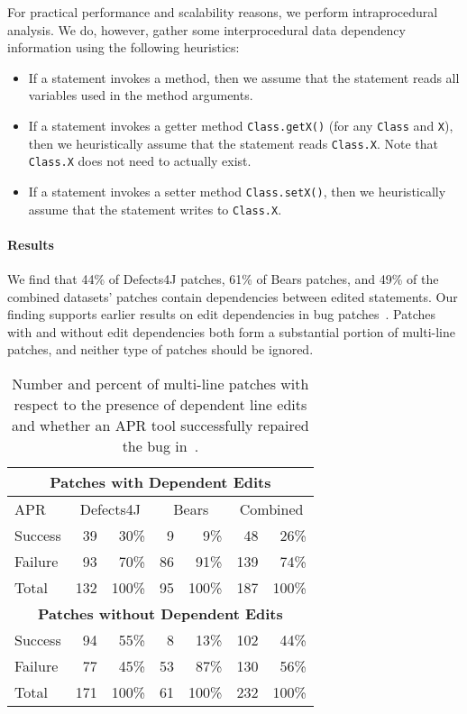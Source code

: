 \documentclass[sigconf, timestamp-false, anonymous=true]{acmart}
\begin{document}
For practical performance and scalability reasons, 
we perform intraprocedural analysis. 
We do, however, gather some interprocedural data dependency information 
using the following heuristics:
\begin{itemize}
	\item If a statement invokes a method, then we assume that
	the statement reads all variables used in the method arguments.
	\item If a statement invokes a getter method \texttt{Class.getX()} 
	(for any \texttt{Class} and \texttt{X}), then we heuristically 
	assume that the statement reads \texttt{Class.X}. 
	Note that \texttt{Class.X} does not need to actually exist.
	\item If a statement invokes a setter method \texttt{Class.setX()}, 
	then we heuristically assume that the statement writes to \texttt{Class.X}. 
\end{itemize}

\paragraph{Results}

We find that 44\% of Defects4J patches, 61\% of Bears patches, 
and 49\% of the combined datasets' patches contain dependencies 
between edited statements.
Our finding supports earlier results on edit dependencies in 
bug patches~\cite{zhong2015}.
Patches with and without edit dependencies both form a substantial
portion of multi-line patches,
and neither type of patches should be ignored.

\begin{table}
{\begin{center}
	\begin{tabular}{l | rr | rr | rr}
		\toprule
		\multicolumn{7}{c}{\textbf{Patches with Dependent Edits}} \\
		\midrule
		APR & \multicolumn{2}{c}{Defects4J} & \multicolumn{2}{c}{Bears} & \multicolumn{2}{c}{Combined} \\
		\midrule
		Success & 39 & 30\% & 9 & 9\% & 48 & 26\% \\
		Failure & 93 & 70\% & 86 & 91\% & 139 & 74\% \\
		\midrule
		Total & 132 & 100\% & 95 & 100\% & 187 & 100\% \\
		\midrule
		\multicolumn{7}{c}{\textbf{Patches without Dependent Edits}} \\
		\midrule
		Success & 94 & 55\% & 8 & 13\% & 102 & 44\% \\
		Failure & 77 & 45\% & 53 & 87\% & 130 & 56\% \\
		\midrule
		Total & 171 & 100\% & 61 & 100\% & 232 & 100\% \\
		\bottomrule
	\end{tabular}
 \end{center}
}
	\caption{Number and percent of multi-line patches with respect to the presence of 
	dependent line edits and whether an APR tool successfully 
	repaired the bug in~\cite{durieux-repair-them-all}.}
	\label{tab:dependency-repair-contingency-table}
\end{table}
\end{document}
